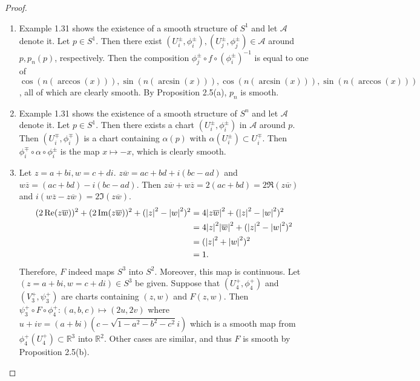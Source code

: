 \begin{proof}
  $ $
  \begin{enumerate}[label=(\alph*)]
    \item 
      Example 1.31 shows the existence of a smooth structure of $S^1$ and let $\mathcal{A}$ denote it.
      Let $p \in S^1$.
      Then there exist $(U_i^{\pm}, \phi_i^{\pm}), (U_j^{\pm}, \phi_j^{\pm}) \in \mathcal{A}$ around $p, p_n(p)$, respectively.
      Then the composition $\phi_j^{\pm} \circ f \circ (\phi_i^{\pm})^{-1}$ is equal to one of $\cos(n(\arccos(x))), \sin(n(\arcsin(x))), \cos(n(\arcsin(x))), \sin(n(\arccos(x)))$, all of which are clearly smooth.
      By Proposition 2.5(a), $p_n$ is smooth.
    \item
      Example 1.31 shows the existence of a smooth structure of $S^n$ and let $\mathcal{A}$ denote it.
      Let $p \in S^1$.
      Then there exists a chart $(U_i^{\pm}, \phi_i^{\pm})$ in $\mathcal{A}$ around $p$.
      Then $(U_i^{\mp}, \phi_i^{\mp})$ is a chart containing $\alpha(p)$ with $\alpha(U_i^{\pm}) \subset U_i^{\mp}$.
      Then $\phi_i^{\mp} \circ \alpha \circ \phi_i^{\pm}$ is the map $x \mapsto -x$, which is clearly smooth.
    \item
      Let $z = a + bi, w = c + di$.
      $z\overline{w} = ac + bd + i(bc - ad)$ and $w\overline{z} = (ac + bd) - i(bc - ad)$.
      Then $z\overline{w} + w\overline{z} = 2(ac + bd) = 2\Re(z\overline{w})$ and $i(w\overline{z} - z\overline{w}) = 2\Im(z\overline{w})$.
      \begin{align*}
        (2\Re(z\overline{w}))^2 + (2\Im(z\overline{w}))^2 + (\abs{z}^2 - \abs{w}^2)^2
          &= 4\abs{z\overline{w}}^2 + (\abs{z}^2 - \abs{w}^2)^2 \\
          &= 4\abs{z}^2\abs{\overline{w}}^2 + (\abs{z}^2 - \abs{w}^2)^2 \\
          &= (\abs{z}^2 + \abs{w}^2)^2 \\
          &= 1.
      \end{align*}
      Therefore, $F$ indeed maps $S^3$ into $S^2$.
      Moreover, this map is continuous.
      Let $(z = a + bi, w = c + di) \in S^3$ be given.
      Suppose that $(U_4^{+}, \phi_4^{+})$ and $(V_3^{+}, \psi_3^{+})$ are charts containing $(z, w)$ and $F(z, w)$.
      Then $\psi_3^{+} \circ F \circ \phi_4^{+}: (a, b, c) \mapsto (2u, 2v)$ where $u + iv = (a + bi)(c - \sqrt{1 - a^2 - b^2 - c^2}i)$ which is a smooth map from $\phi_4^{+}(U_4^{+}) \subset \mathbb{R}^3$ into $\mathbb{R}^2$.
      Other cases are similar, and thus $F$ is smooth by Proposition 2.5(b).
  \end{enumerate}
\end{proof}


